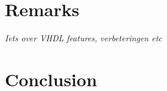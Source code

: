 \documentclass[11pt,british]{article}
\begin{document}


\newpage{}
\section{Remarks}
\emph{\color{red} Iets over VHDL features, verbeteringen etc}

\newpage{}
\section{Conclusion}

\pagebreak{}

\printbibliography

\newpage{}
\end{document}
